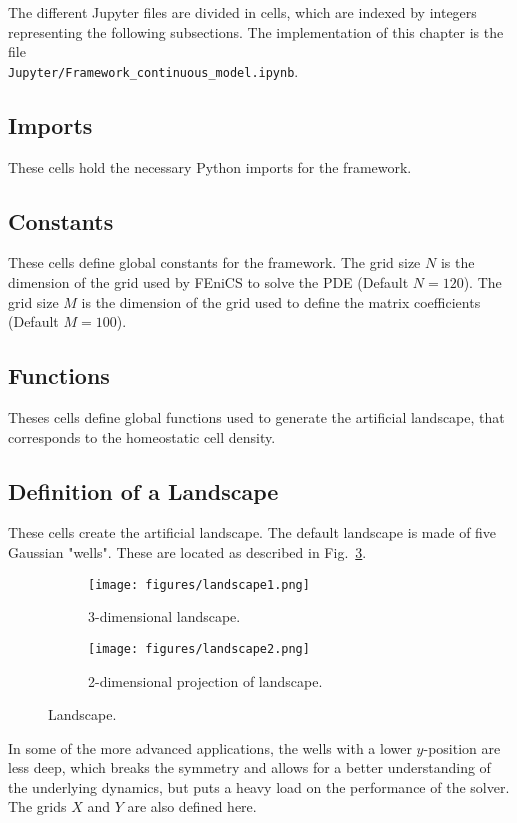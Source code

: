 \documentclass[11pt,oneside]{article}   	%
\newcommand{\python}{Python\xspace}
\newcommand{\fenics}{FEniCS\xspace}
\newcommand{\jupyter}{Jupyter\xspace}
\renewcommand{\figurename}{Fig.}
\newcommand{\figref}[1]{\figurename~\ref{#1}}
\begin{document}
The different \jupyter files are divided in cells, which are indexed by integers representing the following subsections.
The implementation of this chapter is the file \\\texttt{Jupyter/Framework\_continuous\_model.ipynb}.

\subsection{Imports}
These cells hold the necessary \python imports for the framework.

\subsection{Constants}
These cells define global constants for the framework.
The grid size $N$ is the dimension of the grid used by \fenics to solve the PDE (Default $N = 120$).
The grid size $M$ is the dimension of the grid used to define the matrix coefficients (Default $M = 100$).

\subsection{Functions}
Theses cells define global functions used to generate the artificial landscape, that corresponds to the homeostatic cell density.

\subsection{Definition of a Landscape}
These cells create the artificial landscape.
The default landscape is made of five Gaussian "wells".
These are located as described in \figref{fig:landscape}.

\begin{figure}[h]
\centering
\begin{subfigure}{.5\textwidth}
	\centering
	\texttt{[image: figures/landscape1.png]}
	\caption{3-dimensional landscape.}
	\label{fig:sub1}
\end{subfigure}%
\begin{subfigure}{.5\textwidth}
	\centering
	\texttt{[image: figures/landscape2.png]}
	\caption{2-dimensional projection of landscape.}
	\label{fig:sub2}
\end{subfigure}
\caption{Landscape.}
\label{fig:landscape}
\end{figure}
In some of the more advanced applications, the wells with a lower $y$-position are less deep, which breaks the symmetry and allows for a better understanding of the underlying dynamics, but puts a heavy load on the performance of the solver.
The grids $X$ and $Y$ are also defined here. 
\end{document}
